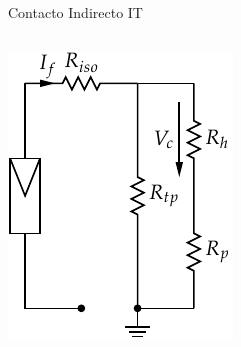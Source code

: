 \documentclass[xcolor={usenames,svgnames,dvipsnames}]{beamer}
\begin{document}
\begin{frame}[label={sec:org0a4e888}]{Contacto Indirecto IT}
\begin{columns}
\begin{column}{0.5\columnwidth}
\begin{center}
\includegraphics[width=\textwidth]{../figs/ContactoIndirectoIT_simple.pdf}
\end{center}
\end{column}
\end{columns}
\end{frame}
\end{document}
